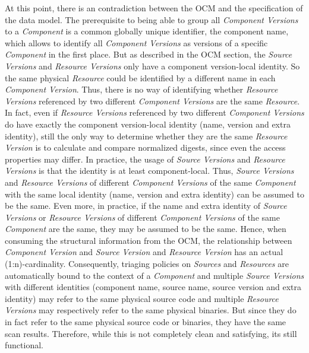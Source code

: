 At this point, there is an contradiction between the OCM and the specification of the data model. The prerequisite to being able to group all \emph{Component Versions} to a \emph{Component} is a common globally unique identifier, the component name, which allows to identify all \emph{Component Versions} as versions of a specific \emph{Component} in the first place. But as described in the OCM section, the \emph{Source Versions} and \emph{Resource Versions} only have a component version-local identity. So the same physical \emph{Resource} could be identified by a different name in each \emph{Component Version}. Thus, there is no way of identifying whether \emph{Resource Versions} referenced by two different \emph{Component Versions} are the same \emph{Resource}. In fact, even if \emph{Resource Versions} referenced by two different \emph{Component Versions} do have exactly the component version-local identity (name, version and extra identity), still the only way to determine whether they are the same \emph{Resource Version} is to calculate and compare normalized digests, since even the access properties may differ. In practice, the usage of \emph{Source Versions} and \emph{Resource Versions} is that the identity is at least component-local. Thus, \emph{Source Versions} and \emph{Resource Versions} of different \emph{Component Versions} of the same \emph{Component} with the same local identity (name, version and extra identity) can be assumed to be the same. Even more, in practice, if the name and extra identity of \emph{Source Versions} or \emph{Resource Versions} of different \emph{Component Versions} of the same \emph{Component} are the same, they may be assumed to be the same. Hence, when consuming the structural information from the OCM, the relationship between \emph{Component Version} and \emph{Source Version} and \emph{Resource Version} has an actual (1:n)-cardinality. Consequently, triaging policies on \emph{Sources} and \emph{Resources} are automatically bound to the context of a \emph{Component} and multiple \emph{Source Versions} with different identities (component name, source name, source version and extra identity) may refer to the same physical source code and multiple \emph{Resource Versions} may respectively refer to the same physical binaries. But since they do in fact refer to the same physical source code or binaries, they have the same scan results. Therefore, while this is not completely clean and satisfying, its still functional.\par 






